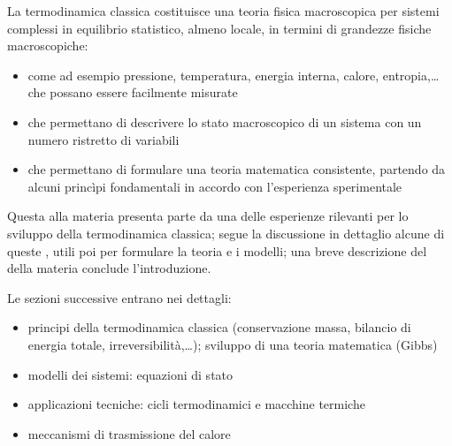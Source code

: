 \documentclass[letterpaper,10pt,italian]{jupyterBook}
\begin{document}
\sphinxAtStartPar
La termodinamica classica costituisce una teoria fisica macroscopica per sistemi complessi in equilibrio statistico, almeno locale, in termini di grandezze fisiche macroscopiche:
\begin{itemize}
\item {} 
\sphinxAtStartPar
come ad esempio pressione, temperatura, energia interna, calore, entropia,… che possano essere facilmente misurate

\item {} 
\sphinxAtStartPar
che permettano di descrivere lo stato macroscopico di un sistema con un numero ristretto di variabili

\item {} 
\sphinxAtStartPar
che permettano di formulare una teoria matematica consistente, partendo da alcuni princìpi fondamentali in accordo con l’esperienza sperimentale

\end{itemize}

\sphinxAtStartPar
{}

\sphinxAtStartPar
Questa  alla materia presenta parte da una {\hyperref[\detokenize{ch/thermodynamics/foundation-history:physics-hs-thermodynamics-foundation-history}]{}} delle esperienze rilevanti per lo sviluppo della termodinamica classica; segue la discussione in dettaglio alcune di queste {\hyperref[\detokenize{ch/thermodynamics/foundation-experiments:physics-hs-thermodynamics-foundation-experiments}]{}}, utili poi per formulare la teoria e i modelli; una breve descrizione del {\hyperref[\detokenize{ch/thermodynamics/foundation-atomic-theory:physics-hs-thermodynamics-foundation-atomic-theory}]{}} della materia conclude l’introduzione.

\sphinxAtStartPar
Le sezioni successive entrano nei dettagli:
\begin{itemize}
\item {} 
\sphinxAtStartPar
principi della termodinamica classica (conservazione massa, bilancio di energia totale, irreversibilità,…); sviluppo di una teoria matematica (Gibbs)

\item {} 
\sphinxAtStartPar
modelli dei sistemi: equazioni di stato

\item {} 
\sphinxAtStartPar
applicazioni tecniche: cicli termodinamici e macchine termiche

\item {} 
\sphinxAtStartPar
meccanismi di trasmissione del calore

\end{itemize}
\end{document}

